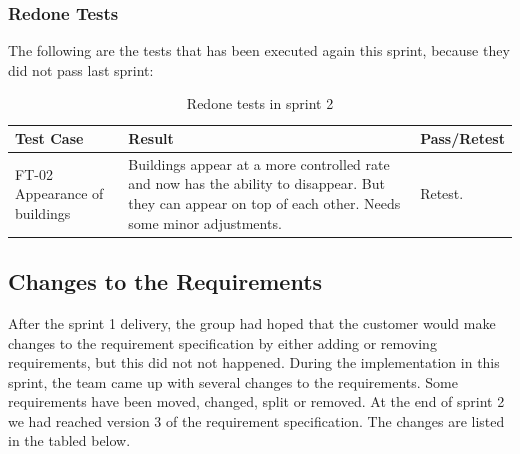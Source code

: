 	\subsubsection{Redone Tests}

	The following are the tests that has been executed again this sprint, because they did not pass last sprint:

	\begin{table}
	\begin{tabular}{| p{3cm} | p{6.5cm} | p{2.5cm} |}
		\hline
		\rowcolor{lightgray}
		{\bf Test Case} & {\bf Result} & {\bf Pass/Retest} \\ \hline

		FT-02 Appearance of buildings & Buildings appear at a more controlled rate and now has the ability to disappear. But they can appear on top of each other. Needs some minor adjustments. & Retest. \\ \hline

	\end{tabular}
	\caption{Redone tests in sprint 2}
	\end{table}

\subsection{Changes to the Requirements}
	
	After the sprint 1 delivery, the group had hoped that the customer would make 
	changes to the requirement specification by either adding or removing requirements, 
	but this did not not happened. During the implementation in this sprint, the 
	team came up with several changes to the requirements. Some requirements have been moved, 
	changed, split or removed. At the end of sprint 2 we had reached version 3 of the requirement 
	specification. The changes are listed in the tabled below.

